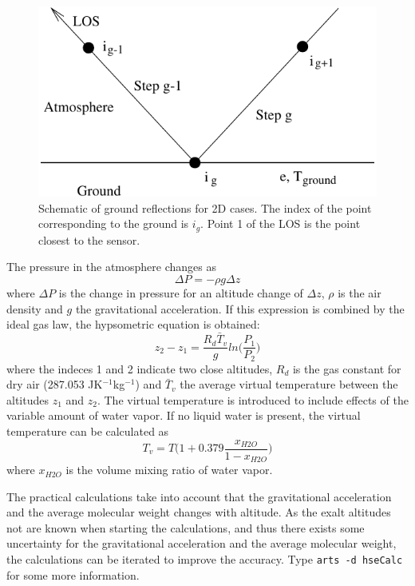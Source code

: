   \begin{figure}
   \begin{center}
     \includegraphics*[width=0.75\hsize]{Figs/ground}
    \caption{Schematic of ground reflections for 2D cases. The index 
             of the point corresponding to the ground is $i_g$. Point 1
             of the LOS is the point closest to the sensor. }  
    \label{fig:los1d:ground}  
   \end{center}
  \end{figure}

 
 \label{sec:los:hse}

 The pressure in the atmosphere changes as
 \begin{equation}
   \Delta P = -\rho g \Delta z
 \end{equation}
 where $\Delta P$ is the change in pressure for an altitude change of
 $\Delta z$, $\rho$ is the air density and $g$ the gravitational 
 acceleration. If this expression is combined by the ideal gas law, the
 hypsometric equation is obtained:
 \begin{equation}
   z_2 - z_1 = \frac{R_d\bar{T}_v}{g}ln\Big( \frac{P_1}{P_2} \Big)
 \end{equation}
 where the indeces 1 and 2 indicate two close altitudes, $R_d$ is the
 gas constant for dry air (287.053 JK$^{-1}$kg$^{-1}$) and $\bar{T}_v$
 the average virtual temperature between the altitudes $z_1$ and
 $z_2$.  The virtual temperature is introduced to include effects of
 the variable amount of water vapor. If no liquid water is present, the
 virtual temperature can be calculated as
 \begin{equation}
   T_v = T \Big( 1+0.379\frac{x_{H2O}}{1-x_{H2O}}  \Big)
 \end{equation}
 where $x_{H2O}$ is the volume mixing ratio of water vapor. 
 
 The practical calculations take into account that the gravitational
 acceleration and the average molecular weight changes with altitude.
 As the exalt altitudes not are known when starting the calculations,
 and thus there exists some uncertainty for the gravitational
 acceleration and the average molecular weight, the calculations can
 be iterated to improve the accuracy. Type \verb|arts -d hseCalc| for
 some more information.




